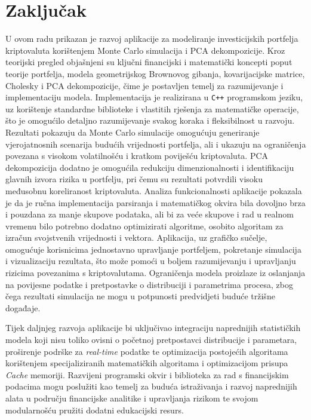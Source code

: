 \documentclass[zavrsnirad]{fer}
\begin{document}
\chapter{Zaključak}
\label{pog:zakljucak}
U ovom radu prikazan je razvoj aplikacije za modeliranje investicijskih
portfelja kriptovaluta korištenjem Monte Carlo simulacija
i PCA dekompozicije. Kroz teorijski pregled objašnjeni su ključni
financijski i matematički koncepti poput teorije portfelja, modela
geometrijskog Brownovog gibanja, kovarijacijske matrice,
Cholesky i PCA dekompozicije, čime je postavljen temelj za razumijevanje
i implementaciju modela. Implementacija je realizirana u \texttt{C++} programskom
jeziku, uz korištenje standardne biblioteke i vlastitih rješenja za
matematičke operacije, što je omogućilo detaljno razumijevanje svakog
koraka i fleksibilnost u razvoju.
Rezultati pokazuju da Monte Carlo simulacije omogućuju generiranje
vjerojatnosnih scenarija budućih vrijednosti portfelja, ali i ukazuju na
ograničenja povezana s visokom volatilnošću i kratkom poviješću kriptovaluta.
PCA dekompozicija dodatno je omogućila redukciju dimenzionalnosti i
identifikaciju glavnih izvora rizika u portfelju, pri čemu su rezultati
potvrdili visoku međusobnu koreliranost kriptovaluta. Analiza
funkcionalnosti aplikacije pokazala je da je ručna implementacija
parsiranja i matematičkog okvira bila dovoljno brza i pouzdana za manje
skupove podataka, ali bi za veće skupove i rad u realnom vremenu bilo
potrebno dodatno optimizirati algoritme, osobito algoritam za izračun svojstvenih
vrijednosti i vektora.
Aplikacija, uz grafičko sučelje, omogućuje korisnicima jednostavno
upravljanje portfeljem, pokretanje simulacija i vizualizaciju rezultata,
što može pomoći u boljem razumijevanju i upravljanju rizicima povezanima s
kriptovalutama. Ograničenja modela proizlaze iz oslanjanja na povijesne
podatke i pretpostavke o distribuciji i parametrima procesa, zbog čega rezultati
simulacija ne mogu u potpunosti predvidjeti buduće tržišne događaje.

Tijek daljnjeg razvoja aplikacije bi uključivao integraciju naprednijih
statističkih modela koji nisu toliko ovisni o početnoj pretpostavci
distribucije i parametara, proširenje podrške za \textit{real-time}
podatke te optimizacija postojećih algoritama korištenjem specijaliziranih
matematičkih algoritama i optimizacijom prisupa \textit{Cache} memoriji.
Razvijeni programski okvir i biblioteka za rad s
financijskim podacima mogu poslužiti kao temelj za buduća istraživanja i
razvoj naprednijih alata u području financijske analitike i upravljanja
rizikom te svojom modularnošću pružiti dodatni edukacijski resurs.
\end{document}
